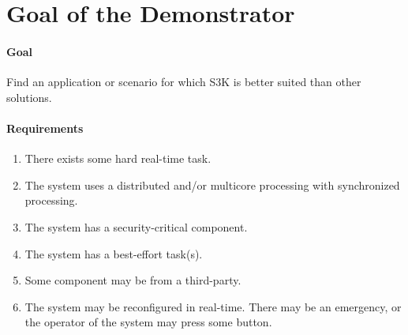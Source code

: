 \section{Goal of the Demonstrator}

\paragraph{Goal} Find an application or scenario for which S3K is better suited than other solutions.

\paragraph{Requirements}
\begin{enumerate}[label=R\arabic*)]
	\item There exists some hard real-time task.
	\item The system uses a distributed and/or multicore processing with synchronized processing.
	\item The system has a security-critical component.
	\item The system has a best-effort task(s).
	\item Some component may be from a third-party.
	\item The system may be reconfigured in real-time. There may be an emergency, or the operator of the system may press some button.
\end{enumerate}
